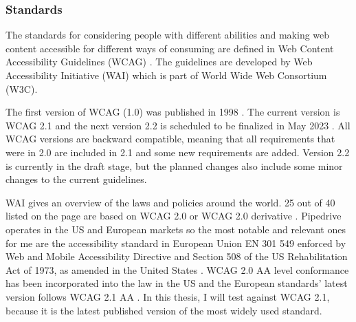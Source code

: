 \documentclass{master_thesis}
\begin{document}
\subsubsection{Standards}

The standards for considering people with different abilities and making web content accessible for different ways of consuming are defined in Web Content Accessibility Guidelines (WCAG) \citep{Kirkpatrick2018}. The guidelines are developed by Web Accessibility Initiative (WAI) which is part of World Wide Web Consortium (W3C).

The first version of WCAG (1.0) was published in 1998 \citep{Vanderheiden1998}. The current version is WCAG 2.1 and the next version 2.2 is scheduled to be finalized in May 2023 \citep{Henry2023}. All WCAG versions are backward compatible, meaning that all requirements that were in 2.0 are included in 2.1 and some new requirements are added. Version 2.2 is currently in the draft stage, but the planned changes also include some minor changes to the current guidelines.

WAI gives an overview of the laws and policies around the world. 25 out of 40 listed on the page are based on WCAG 2.0 or WCAG 2.0 derivative \citep{Mueller2018}. Pipedrive operates in the US and European markets so the most notable and relevant ones for me are the accessibility standard in European Union EN 301 549 enforced by Web and Mobile Accessibility Directive \citep{MuellerEU2017} and Section 508 of the US Rehabilitation Act of 1973, as amended in the United States \citep{MuellerUS2017}. WCAG 2.0 AA level conformance has been incorporated into the law in the US and the European standards' latest version follows WCAG 2.1 AA \citep{LevelAccess2021}. In this thesis, I will test against WCAG 2.1, because it is the latest published version of the most widely used standard.

\end{document}
